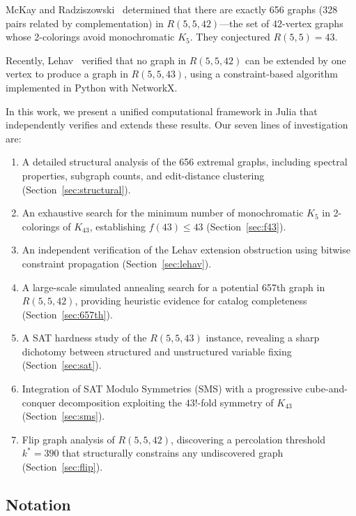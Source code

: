 \documentclass[11pt,a4paper]{article}
\theoremstyle{definition}
\theoremstyle{remark}
\newcommand{\Kn}[1]{K_{#1}}
\newcommand{\Rset}[3]{R(#1,#2,#3)}
\begin{document}
McKay and Radziszowski~\cite{McKayRadz1997} determined that there
are exactly 656 graphs (328 pairs related by complementation)
in $\Rset{5}{5}{42}$---the set of 42-vertex graphs whose
2-colorings avoid monochromatic $K_5$.
They conjectured $R(5,5) = 43$.

Recently, Lehav~\cite{Lehav2024} verified that no graph in
$\Rset{5}{5}{42}$ can be extended by one vertex to produce
a graph in $\Rset{5}{5}{43}$, using a constraint-based algorithm
implemented in Python with NetworkX.

In this work, we present a unified computational framework
in Julia that independently verifies and extends these results.
Our seven lines of investigation are:
\begin{enumerate}[label=(\roman*)]
  \item A detailed structural analysis of the 656 extremal graphs,
    including spectral properties, subgraph counts, and
    edit-distance clustering (Section~\ref{sec:structural}).
  \item An exhaustive search for the minimum number of
    monochromatic $K_5$ in 2-colorings of $\Kn{43}$,
    establishing $f(43) \leq 43$
    (Section~\ref{sec:f43}).
  \item An independent verification of the Lehav extension
    obstruction using bitwise constraint propagation
    (Section~\ref{sec:lehav}).
  \item A large-scale simulated annealing search for a potential
    657th graph in $\Rset{5}{5}{42}$, providing heuristic evidence
    for catalog completeness (Section~\ref{sec:657th}).
  \item A SAT hardness study of the $R(5,5,43)$ instance,
    revealing a sharp dichotomy between structured and
    unstructured variable fixing (Section~\ref{sec:sat}).
  \item Integration of SAT Modulo Symmetries (SMS) with a
    progressive cube-and-conquer decomposition exploiting the
    $43!$-fold symmetry of $\Kn{43}$ (Section~\ref{sec:sms}).
  \item Flip graph analysis of $\Rset{5}{5}{42}$, discovering
    a percolation threshold $k^* = 390$ that structurally
    constrains any undiscovered graph (Section~\ref{sec:flip}).
\end{enumerate}

\subsection{Notation}
\end{document}
